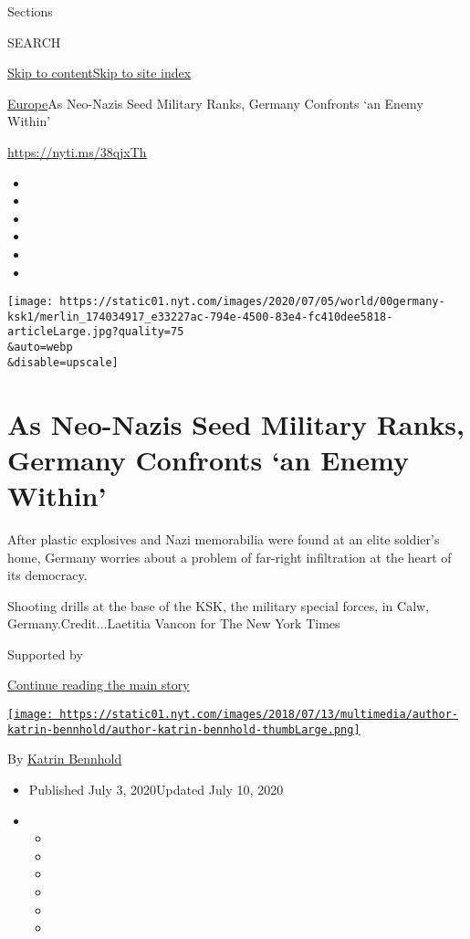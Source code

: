 Sections

SEARCH

\protect\hyperlink{site-content}{Skip to
content}\protect\hyperlink{site-index}{Skip to site index}

\href{/section/world/europe}{Europe}\textbar{}As Neo-Nazis Seed Military
Ranks, Germany Confronts `an Enemy Within'

\url{https://nyti.ms/38qjxTh}

\begin{itemize}
\item
\item
\item
\item
\item
\item
\end{itemize}

\texttt{[image: https://static01.nyt.com/images/2020/07/05/world/00germany-ksk1/merlin\_174034917\_e33227ac-794e-4500-83e4-fc410dee5818-articleLarge.jpg?quality=75\\\&auto=webp\\\&disable=upscale]}

\hypertarget{as-neo-nazis-seed-military-ranks-germany-confronts-an-enemy-within}{%
\section{As Neo-Nazis Seed Military Ranks, Germany Confronts `an Enemy
Within'}\label{as-neo-nazis-seed-military-ranks-germany-confronts-an-enemy-within}}

After plastic explosives and Nazi memorabilia were found at an elite
soldier's home, Germany worries about a problem of far-right
infiltration at the heart of its democracy.

Shooting drills at the base of the KSK, the military special forces, in
Calw, Germany.Credit...Laetitia Vancon for The New York Times

Supported by

\protect\hyperlink{after-sponsor}{Continue reading the main story}

\href{https://www.nytimes.com/by/katrin-bennhold}{\texttt{[image: https://static01.nyt.com/images/2018/07/13/multimedia/author-katrin-bennhold/author-katrin-bennhold-thumbLarge.png]}}

By \href{https://www.nytimes.com/by/katrin-bennhold}{Katrin Bennhold}

\begin{itemize}
\item
  Published July 3, 2020Updated July 10, 2020
\item
  \begin{itemize}
  \item
  \item
  \item
  \item
  \item
  \item
  \end{itemize}
\end{itemize}

